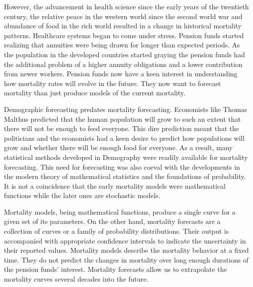 \documentclass{article}
\numberwithin{equation}{section}
\begin{document}
However, the advancement in health science since the early years of the 
twentieth century, the relative peace in the western world since the second 
world war and abundance of food in the rich world resulted in a change in
historical mortality patterns. Healthcare systems began to come under stress.
Pension funds started realizing that annuities
were being drawn for longer than expected periods. As the population in the
developed countries started graying the pension funds had the additional 
problem of a higher annuity obligations and a lower contribution from newer
workers. Pension funds now have a keen interest in understanding how mortality 
rates will evolve in the future. They now want to forecast mortality than just
produce models of the current mortality. 

Demographic forecasting predates mortality forecasting. Economists like Thomas
Malthus predicted that the human population will grow to such an extent that
there will not be enough to feed everyone. This dire prediction meant that the
politicians and the economists had a keen desire to predict how populations
will grow and whether there will be enough food for everyone. As a result, many 
statistical methods developed in Demography were readily available for mortality
forecasting. This need for forecasting was also coeval with the developments
in the modern theory of mathematical statistics and the foundations of
probability. It is not a coincidence that the early mortality models were
mathematical functions while the later ones are stochastic models.

Mortality models, being mathematical functions, produce a single curve for
a given set of its parameters. On the other hand, mortality forecasts are a
collection of curves or a family of probability distributions. Their output
is accompanied with appropriate confidence intervals to indicate the 
uncertainty in their reported values. Mortality models describe the mortality
behavior at a fixed time. They do not predict the changes in mortality over
long enough durations of the pension funds' interest. Mortality forecasts
allow us to extrapolate the mortality curves several decades into the future.
\end{document}
